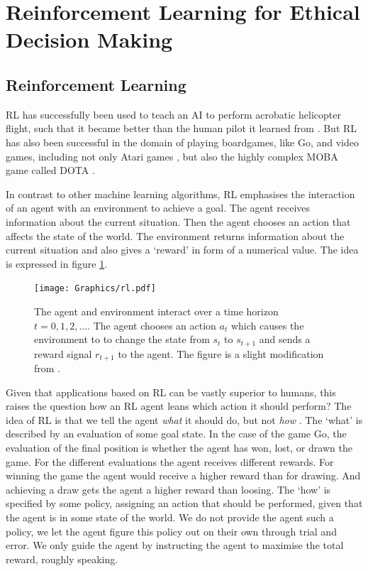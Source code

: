 \section{Reinforcement Learning for Ethical Decision Making}
\label{rledm}


\subsection{Reinforcement Learning}

RL has successfully been used to teach an AI to perform acrobatic helicopter flight, such that it became better than the human pilot it learned from \citep{abbeel2007application}. But RL has also been successful in the domain of playing boardgames, like Go, and video games, including not only Atari games \citep{mnih2013playing}, but also the highly complex MOBA game called DOTA \citep{openai018dota}. 

In contrast to other machine learning algorithms, RL emphasises the interaction of an agent with an environment to achieve a goal. The agent receives information about the current situation. Then the agent chooses an action that affects the state of the world. The environment returns information about the current situation and also gives a `reward' in form of a numerical value. The idea is expressed in figure \ref{fig:rl}. 

\begin{figure}[h]
    \centering
    \texttt{[image: Graphics/rl.pdf]}
    \caption{The agent and environment interact over a time horizon $t=0,1,2,\ldots$. The agent chooses an action $a_t$ which causes the environment to to change the state from $s_t$ to $s_{t+1}$ and sends a reward signal $r_{t+1}$ to the agent. The figure is a slight modification from \citet[p.~52]{sutton1998reinforcement}.}
    \label{fig:rl}
\end{figure}

Given that applications based on RL can be vastly superior to humans, this raises the question how an RL agent leans which action it should perform? The idea of RL is that we tell the agent \emph{what} it should do, but not \emph{how} \citep[p.~56f]{sutton1998reinforcement}. The `what' is described by an evaluation of some goal state. In the case of the game Go, the evaluation of the final position is whether the agent has won, lost, or drawn the game. For the different evaluations the agent receives different rewards. For winning the game the agent would receive a higher reward than for drawing. And achieving a draw gets the agent a higher reward than loosing. The `how' is specified by some policy, assigning an action that should be performed, given that the agent is in some state of the world. We do not provide the agent such a policy, we let the agent figure this policy out on their own through trial and error. We only guide the agent by instructing the agent to maximise the total reward, roughly speaking.

